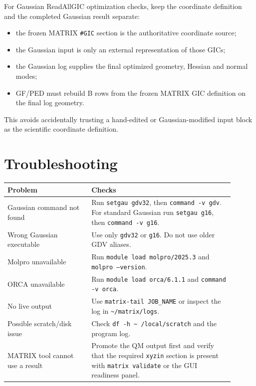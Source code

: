 \documentclass[11pt]{article}
\newcommand{\xyzin}{\texttt{xyzin}}
\begin{document}
For Gaussian ReadAllGIC optimization checks, keep the coordinate definition and
the completed Gaussian result separate:

\begin{itemize}
  \item the frozen MATRIX \texttt{\#GIC} section is the authoritative
        coordinate source;
  \item the Gaussian input is only an external representation of those GICs;
  \item the Gaussian log supplies the final optimized geometry, Hessian and
        normal modes;
  \item GF/PED must rebuild B rows from the frozen MATRIX GIC definition on
        the final log geometry.
\end{itemize}

This avoids accidentally trusting a hand-edited or Gaussian-modified input
block as the scientific coordinate definition.

\section{Troubleshooting}

\begin{longtable}{
  >{\raggedright\arraybackslash}p{0.33\linewidth}
  >{\raggedright\arraybackslash}p{0.57\linewidth}}
\toprule
Problem & Checks \\
\midrule
Gaussian command not found &
Run \texttt{setgau gdv32}, then \texttt{command -v gdv}.  For standard Gaussian
run \texttt{setgau g16}, then \texttt{command -v g16}. \\
Wrong Gaussian executable &
Use only \texttt{gdv32} or \texttt{g16}.  Do not use older GDV aliases. \\
Molpro unavailable &
Run \texttt{module load molpro/2025.3} and \texttt{molpro --version}. \\
ORCA unavailable &
Run \texttt{module load orca/6.1.1} and \texttt{command -v orca}. \\
No live output &
Use \texttt{matrix-tail JOB\_NAME} or inspect the log in
\texttt{\textasciitilde/matrix/logs}. \\
Possible scratch/disk issue &
Check \texttt{df -h \textasciitilde{} /local/scratch} and the program log. \\
MATRIX tool cannot use a result &
Promote the QM output first and verify that the required \xyzin{} section is
present with \texttt{matrix validate} or the GUI readiness panel. \\
\bottomrule
\end{longtable}
\end{document}
